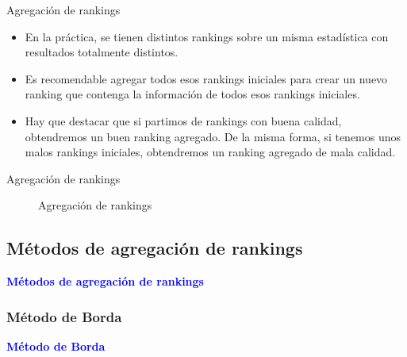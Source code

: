 \documentclass[10pt]{beamer}
\begin{document}
	\begin{frame}{Agregación de rankings}
		
		\begin{itemize}
		\item En la práctica, se tienen distintos rankings sobre un misma estadística con resultados totalmente distintos.\\
		
		\item Es recomendable agregar todos esos rankings iniciales para crear un nuevo ranking que contenga la información de todos esos rankings iniciales.\\
		
		\item Hay que destacar que si partimos de rankings con buena calidad, obtendremos un buen ranking agregado. De la misma forma, si tenemos unos malos rankings iniciales, obtendremos un ranking agregado de mala calidad.
		\end{itemize}
	\end{frame}
	
	\begin{frame}{Agregación de rankings}
		\begin{figure}
			\centering
			\agregacionrankings
			\caption{Agregación de rankings}
			\label{fig:agregación_rankings}
		\end{figure}
	\end{frame}
	
	\subsection{Métodos de agregación de rankings}
	
	\begin{frame}
		\begin{center}
			\Huge\textbf{\textsf{\textcolor{blue}{Métodos de agregación de rankings}}}
		\end{center}
	\end{frame}
	
	\subsubsection{Método de Borda}
	
	\begin{frame}
		\begin{center}
			\Huge\textbf{\textsf{\textcolor{blue}{Método de Borda}}}
		\end{center}
	\end{frame}
	
\end{document}
